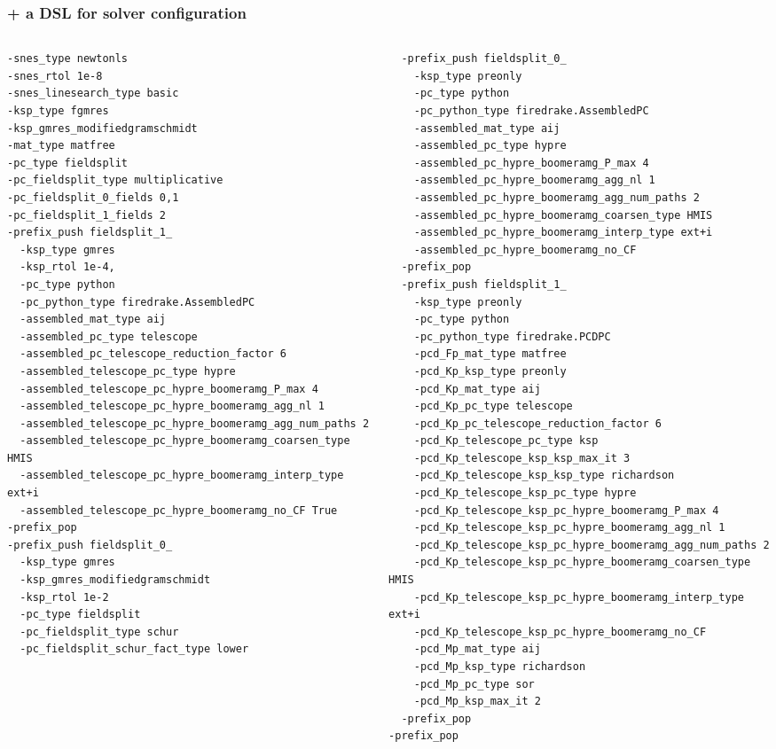 \documentclass[presentation]{beamer}
\begin{document}
\begin{frame}[fragile]
  \frametitle{ + a DSL for solver configuration}
  \begin{columns}
    \begin{column}{0.5\textwidth}
      {\fontsize{4.5}{4.5}\selectfont
\begin{verbatim}
-snes_type newtonls
-snes_rtol 1e-8
-snes_linesearch_type basic
-ksp_type fgmres
-ksp_gmres_modifiedgramschmidt
-mat_type matfree
-pc_type fieldsplit
-pc_fieldsplit_type multiplicative
-pc_fieldsplit_0_fields 0,1
-pc_fieldsplit_1_fields 2
-prefix_push fieldsplit_1_
  -ksp_type gmres
  -ksp_rtol 1e-4,
  -pc_type python
  -pc_python_type firedrake.AssembledPC
  -assembled_mat_type aij
  -assembled_pc_type telescope
  -assembled_pc_telescope_reduction_factor 6
  -assembled_telescope_pc_type hypre
  -assembled_telescope_pc_hypre_boomeramg_P_max 4
  -assembled_telescope_pc_hypre_boomeramg_agg_nl 1
  -assembled_telescope_pc_hypre_boomeramg_agg_num_paths 2
  -assembled_telescope_pc_hypre_boomeramg_coarsen_type HMIS
  -assembled_telescope_pc_hypre_boomeramg_interp_type ext+i
  -assembled_telescope_pc_hypre_boomeramg_no_CF True
-prefix_pop
-prefix_push fieldsplit_0_
  -ksp_type gmres
  -ksp_gmres_modifiedgramschmidt
  -ksp_rtol 1e-2
  -pc_type fieldsplit
  -pc_fieldsplit_type schur
  -pc_fieldsplit_schur_fact_type lower
\end{verbatim}
        }
      \end{column}
      \begin{column}{0.5\textwidth}
        {\fontsize{4.5}{4.5}\selectfont
\begin{verbatim}
  -prefix_push fieldsplit_0_
    -ksp_type preonly
    -pc_type python
    -pc_python_type firedrake.AssembledPC
    -assembled_mat_type aij
    -assembled_pc_type hypre
    -assembled_pc_hypre_boomeramg_P_max 4
    -assembled_pc_hypre_boomeramg_agg_nl 1
    -assembled_pc_hypre_boomeramg_agg_num_paths 2
    -assembled_pc_hypre_boomeramg_coarsen_type HMIS
    -assembled_pc_hypre_boomeramg_interp_type ext+i
    -assembled_pc_hypre_boomeramg_no_CF
  -prefix_pop
  -prefix_push fieldsplit_1_
    -ksp_type preonly
    -pc_type python
    -pc_python_type firedrake.PCDPC
    -pcd_Fp_mat_type matfree
    -pcd_Kp_ksp_type preonly
    -pcd_Kp_mat_type aij
    -pcd_Kp_pc_type telescope
    -pcd_Kp_pc_telescope_reduction_factor 6
    -pcd_Kp_telescope_pc_type ksp
    -pcd_Kp_telescope_ksp_ksp_max_it 3
    -pcd_Kp_telescope_ksp_ksp_type richardson
    -pcd_Kp_telescope_ksp_pc_type hypre
    -pcd_Kp_telescope_ksp_pc_hypre_boomeramg_P_max 4
    -pcd_Kp_telescope_ksp_pc_hypre_boomeramg_agg_nl 1
    -pcd_Kp_telescope_ksp_pc_hypre_boomeramg_agg_num_paths 2
    -pcd_Kp_telescope_ksp_pc_hypre_boomeramg_coarsen_type HMIS
    -pcd_Kp_telescope_ksp_pc_hypre_boomeramg_interp_type ext+i
    -pcd_Kp_telescope_ksp_pc_hypre_boomeramg_no_CF
    -pcd_Mp_mat_type aij
    -pcd_Mp_ksp_type richardson
    -pcd_Mp_pc_type sor
    -pcd_Mp_ksp_max_it 2
  -prefix_pop
-prefix_pop
\end{verbatim}
}
      \end{column}
  \end{columns}
\end{frame}
\end{document}
